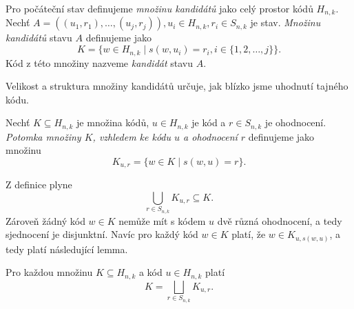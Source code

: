 \begin{definice}\label{kandidat}
  Pro počáteční stav definujeme \emph{množinu kandidátů} jako celý prostor kódů $H_{n,k}$. Nechť $A = \left((u_1, r_1), \dots, (u_j,r_j)\right), u_i \in H_{n,k}, r_i \in S_{n,k}$ je stav. \emph{Množinu kandidátů} stavu $A$ definujeme jako
  \[K = \{w \in H_{n,k} \mid s(w,u_i) = r_i,  i \in \{1,2,\dots ,j\} \}.\]
  Kód z této množiny nazveme \emph{kandidát} stavu $A$. 
  

\end{definice}
Velikost a struktura množiny kandidátů určuje, jak blízko jsme uhodnutí tajného kódu.
\begin{definice}\label{defpotomekmnoziny}
  Nechť $K \subseteq H_{n,k}$ je množina kódů, $u \in H_{n,k}$ je kód a $r \in S_{n,k}$ je ohodnocení. \emph{Potomka množiny $K$, vzhledem ke kódu $u$ a ohodnocení $r$} definujeme jako množinu 
  \[K_{u,r} = \{w \in K \mid s(w,u) = r\}.\] 
\end{definice}
Z definice plyne
\[\bigcup_{r\in S_{n,k}} K_{u,r} \subseteq K.\] Zároveň žádný kód $w \in K$ nemůže mít s kódem $u$ dvě různá ohodnocení, a tedy sjednocení je disjunktní. Navíc pro každý kód $w \in K$ platí, že $w \in K_{u, s(w,u)}$, a tedy platí následující lemma.

\begin{lemma}\label{lemmadisjunktnipotomci}
    Pro každou množinu $K \subseteq H_{n,k}$ a kód $u \in H_{n,k}$ platí
    \[K = \bigsqcup_{r\in S_{n,k}} K_{u,r}.\]
\end{lemma}


